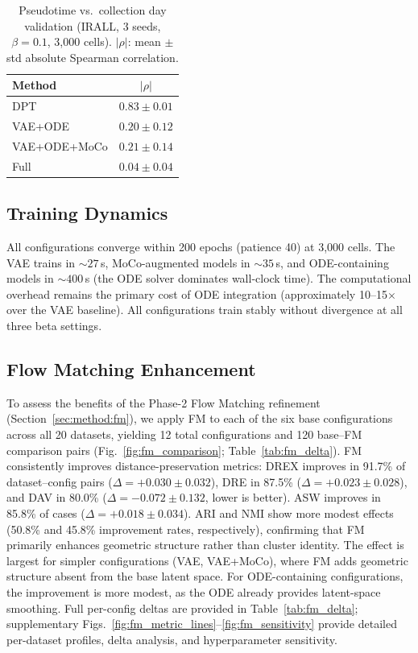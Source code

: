 \documentclass[preprint,12pt,number]{elsarticle}
\begin{document}
\begin{table}[!t]
    \centering
    \caption{Pseudotime vs.\ collection day validation (IRALL, 3 seeds, $\beta{=}0.1$, 3{,}000 cells). $|\rho|$: mean $\pm$ std absolute Spearman correlation.}
    \label{tab:pseudotime_val}
    \begin{tabular}{lc}
        \toprule
        Method & $|\rho|$ \\
        \midrule
        DPT~\cite{haghverdi2016dpt} & $\mathbf{0.83 \pm 0.01}$ \\
        \midrule
        VAE+ODE       & $0.20 \pm 0.12$ \\
        VAE+ODE+MoCo  & $0.21 \pm 0.14$ \\
        Full           & $0.04 \pm 0.04$ \\
        \bottomrule
    \end{tabular}
\end{table}

\subsection{Training Dynamics}
\label{sec:results:training}

All configurations converge within 200 epochs (patience 40) at 3{,}000 cells. The VAE trains in ${\sim}27$\,s, MoCo-augmented models in ${\sim}35$\,s, and ODE-containing models in ${\sim}400$\,s (the ODE solver dominates wall-clock time). The computational overhead remains the primary cost of ODE integration (approximately 10--15$\times$ over the VAE baseline). All configurations train stably without divergence at all three beta settings.

\subsection{Flow Matching Enhancement}
\label{sec:results:fm}

To assess the benefits of the Phase-2 Flow Matching refinement (Section~\ref{sec:method:fm}), we apply FM to each of the six base configurations across all 20 datasets, yielding 12 total configurations and 120 base--FM comparison pairs (Fig.~\ref{fig:fm_comparison}; Table~\ref{tab:fm_delta}). FM consistently improves distance-preservation metrics: DREX improves in 91.7\% of dataset--config pairs ($\Delta{=}+0.030 \pm 0.032$), DRE in 87.5\% ($\Delta{=}+0.023 \pm 0.028$), and DAV in 80.0\% ($\Delta{=}-0.072 \pm 0.132$, lower is better). ASW improves in 85.8\% of cases ($\Delta{=}+0.018 \pm 0.034$). ARI and NMI show more modest effects (50.8\% and 45.8\% improvement rates, respectively), confirming that FM primarily enhances geometric structure rather than cluster identity. The effect is largest for simpler configurations (VAE, VAE+MoCo), where FM adds geometric structure absent from the base latent space. For ODE-containing configurations, the improvement is more modest, as the ODE already provides latent-space smoothing. Full per-config deltas are provided in Table~\ref{tab:fm_delta}; supplementary Figs.~\ref{fig:fm_metric_lines}--\ref{fig:fm_sensitivity} provide detailed per-dataset profiles, delta analysis, and hyperparameter sensitivity.
\end{document}
